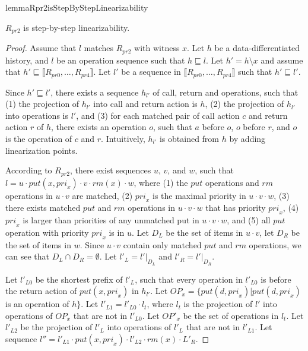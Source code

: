 \documentclass{llncs}
\begin{document}
\begin{restatable}{lemma}{Rpr2isStepByStepLinearizability}
\label{lemma:Rpr2 is step-by-step linearizability}

$R_{\textit{pr2}}$ is step-by-step linearizability.

\end{restatable}

\begin {proof}

Assume that $l$ matches $R_{\textit{pr2}}$ with witness $x$. Let $h$ be a data-differentiated history, and $l$ be an operation sequence such that $h \sqsubseteq l$. Let $h'=h \setminus x$ and assume that $h' \sqsubseteq \llbracket R_{\textit{pr0}},\ldots,R_{\textit{pr4}} \rrbracket$. Let $l'$ be a sequence in $\llbracket R_{\textit{pr0}},\ldots,R_{\textit{pr4}} \rrbracket$ such that $h' \sqsubseteq l'$.

Since $h' \sqsubseteq l'$, there exists a sequence $h_{l'}$ of call, return and operations, such that (1) the projection of $h_{l'}$ into call and return action is $h$, (2) the projection of $h_{l'}$ into operations is $l'$, and (3) for each matched pair of call action $c$ and return action $r$ of $h$, there exists an operation $o$, such that $a$ before $o$, $o$ before $r$, and $o$ is the operation of $c$ and $r$. Intuitively, $h_{l'}$ is obtained from $h$ by adding linearization points.

According to $R_{\textit{pr2}}$, there exist sequences $u$, $v$, and $w$, such that $l=u \cdot \textit{put}(x,\textit{pri}_x) \cdot v \cdot \textit{rm}(x) \cdot w$, where (1) the $\textit{put}$ operations and $\textit{rm}$ operations in $u \cdot v$ are matched, (2) $\textit{pri}_x$ is the maximal priority in $u \cdot v \cdot w$, (3) there exists matched $\textit{put}$ and $\textit{rm}$ operations in $u \cdot v \cdot w$ that has priority $\textit{pri}_x$, (4) $\textit{pri}_x$ is larger than priorities of any unmatched put in $u \cdot v \cdot w$, and (5) all $\textit{put}$ operation with priority $\textit{pri}_x$ is in $u$. Let $D_L$ be the set of items in $u \cdot v$, let $D_R$ be the set of items in $w$. Since $u \cdot v$ contain only matched $\textit{put}$ and $\textit{rm}$ operations, we can see that $D_L \cap D_R = \emptyset$. Let $l'_L = l' \vert_{D_L}$ and $l'_R = l' \vert_{D_R}$.

Let $l'_{\textit{L0}}$ be the shortest prefix of $l'_L$, such that every operation in $l'_{\textit{L0}}$ is before the return action of $\textit{put}(x,\textit{pri}_x)$ in $h_{l'}$. Let $\textit{OP}_x = \{ \textit{put}(d,\textit{pri}_x) \vert \textit{put}(d,\textit{pri}_x)$ is an operation of $h\}$. Let $l'_{\textit{L1}} = l'_{\textit{L0}} \cdot l_t$, where $l_t$ is the projection of $l'$ into operations of $\textit{OP}_x$ that are not in $l'_{\textit{L0}}$. Let $\textit{OP}'_x$ be the set of operations in $l_t$. Let $l'_{\textit{L2}}$ be the projection of $l'_L$ into operations of $l'_L$ that are not in $l'_{\textit{L1}}$. Let sequence $l'' = l'_{L1} \cdot \textit{put}(x,\textit{pri}_x) \cdot l'_{L2} \cdot \textit{rm}(x) \cdot L'_R$.


\end{proof}
\end{document}
